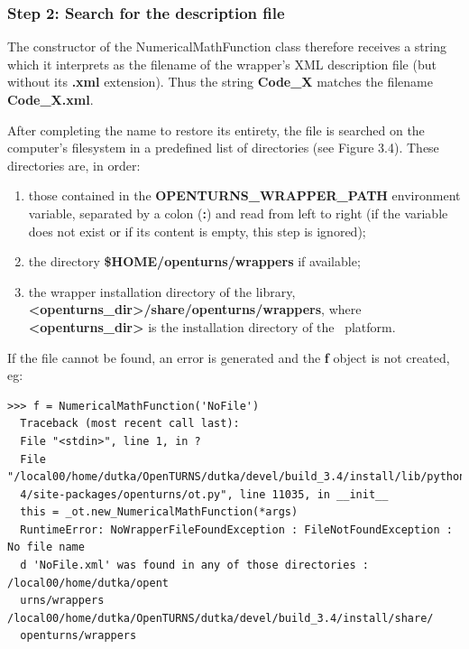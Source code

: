 \subsubsection{Step 2: Search for the description file}

The constructor of the NumericalMathFunction class therefore receives a string which it interprets as the filename of the wrapper's XML description file (but without its {\bf .xml} extension). Thus the string {\bf Code\_X} matches the filename {\bf Code\_X.xml}.

After completing the name to restore its entirety, the file is searched on the computer's filesystem in a predefined list of directories (see Figure 3.4). These directories are, in order:

\begin{enumerate}
\item those contained in the {\bf OPENTURNS\_WRAPPER\_PATH} environment variable, separated by a colon ({\bf :}) and read from left to right (if the variable does not exist or if its content is empty, this step is ignored);
\item the directory {\bf \$HOME/openturns/wrappers} if available;
\item the wrapper installation directory of the library, {\bf <openturns\_dir>/share/openturns/wrappers}, where {\bf <openturns\_dir>} is the installation directory of the \OT\ platform.
\end{enumerate}

If the file cannot be found, an error is generated and the {\bf f} object is not created, eg:

\lstset{language=Python, basicstyle=\normalsize}
\begin{lstlisting}[frame=TBRL]
  >>> f = NumericalMathFunction('NoFile')
  Traceback (most recent call last):
  File "<stdin>", line 1, in ?
  File "/local00/home/dutka/OpenTURNS/dutka/devel/build_3.4/install/lib/python2.
  4/site-packages/openturns/ot.py", line 11035, in __init__
  this = _ot.new_NumericalMathFunction(*args)
  RuntimeError: NoWrapperFileFoundException : FileNotFoundException : No file name
  d 'NoFile.xml' was found in any of those directories : /local00/home/dutka/opent
  urns/wrappers /local00/home/dutka/OpenTURNS/dutka/devel/build_3.4/install/share/
  openturns/wrappers
\end{lstlisting}

